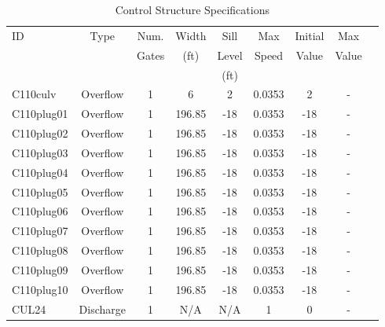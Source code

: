 \scriptsize
\begin{table}[h]
\caption{Control Structure Specifications}
\label{tab:struc-specs1}
\begin{tabular}{@{}lcccccccc@{}}
\toprule
{ID}            & {Type}        & Num.     & Width       & Sill         & Max         & Initial         & Max       \\
                &               & Gates    & (ft)        & Level        & Speed       & Value           & Value     \\
                &               &          &             & (ft)         &             &                 &           \\
\hline
{C110culv}      & Overflow      & 1        & 6           & 2            & 0.0353      & 2               & -            \\
{C110plug01}    & Overflow      & 1        & 196.85      & -18          & 0.0353      & -18             & -            \\
{C110plug02}    & Overflow      & 1        & 196.85      & -18          & 0.0353      & -18             & -            \\
{C110plug03}    & Overflow      & 1        & 196.85      & -18          & 0.0353      & -18             & -            \\
{C110plug04}    & Overflow      & 1        & 196.85      & -18          & 0.0353      & -18             & -            \\
{C110plug05}    & Overflow      & 1        & 196.85      & -18          & 0.0353      & -18             & -            \\
{C110plug06}    & Overflow      & 1        & 196.85      & -18          & 0.0353      & -18             & -            \\
{C110plug07}    & Overflow      & 1        & 196.85      & -18          & 0.0353      & -18             & -            \\
{C110plug08}    & Overflow      & 1        & 196.85      & -18          & 0.0353      & -18             & -            \\
{C110plug09}    & Overflow      & 1        & 196.85      & -18          & 0.0353      & -18             & -            \\
{C110plug10}    & Overflow      & 1        & 196.85      & -18          & 0.0353      & -18             & -            \\
{CUL24}         & Discharge     & 1        & N/A         & N/A          & 1           & 0               & -            \\

\end{tabular}
\end{table}
